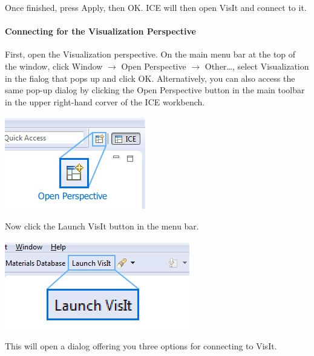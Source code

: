 \documentclass{article}
\begin{document}
Once finished, press Apply, then OK. ICE will then open VisIt and connect to it.

\paragraph{Connecting for the Visualization Perspective} 

First, open the Visualization perspective. On the main menu bar at the top of
the window, click Window $\rightarrow$ Open Perspective $\rightarrow$
Other\ldots, select Visualization in the fialog that pops up and click OK. Alternatively, you can
also access the same pop-up dialog by clicking the Open Perspective button in
the main toolbar in the upper right-hand corver of the ICE workbench. 

\begin{center}
\includegraphics{images/ICE_OpenPerspective}
\end{center}

Now click the Launch VisIt button in the menu bar.

\begin{center}
\includegraphics{images/ICE_VisItLaunchButton}
\end{center}

This will open a dialog offering you three options for connecting to VisIt.
\end{document}
